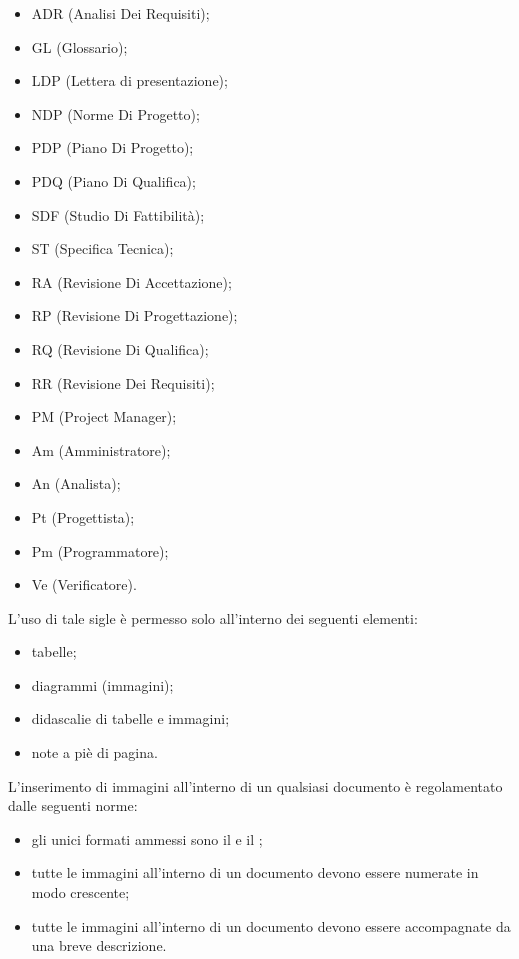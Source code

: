 						\begin{itemize}
							\item ADR (Analisi Dei Requisiti);
							\item GL (Glossario);
							\item LDP (Lettera di presentazione);
							\item NDP (Norme Di Progetto);
							\item PDP (Piano Di Progetto);
							\item PDQ (Piano Di Qualifica);
							\item SDF (Studio Di Fattibilità);
							\item ST (Specifica Tecnica);
							\item RA (Revisione Di Accettazione);
							\item RP (Revisione Di Progettazione);
							\item RQ (Revisione Di Qualifica);
							\item RR (Revisione Dei Requisiti);
							\item PM (Project Manager);
							\item Am (Amministratore);
							\item An (Analista);
							\item Pt (Progettista);
							\item Pm (Programmatore);
							\item Ve (Verificatore).
						\end{itemize}
						L’uso di tale sigle è permesso solo all’interno dei seguenti elementi:
						\begin{itemize}
							\item tabelle;
							\item diagrammi (immagini);
							\item didascalie di tabelle e immagini;
							\item note a piè di pagina.
						\end{itemize}
					L’inserimento di immagini all’interno di un qualsiasi documento è regolamentato dalle seguenti norme:
					\begin{itemize}
						\item gli unici formati ammessi sono il  e il ;
						\item tutte le immagini all’interno di un documento devono essere numerate in modo crescente;
						\item tutte le immagini all’interno di un documento devono essere accompagnate da una breve descrizione.
					\end{itemize}

